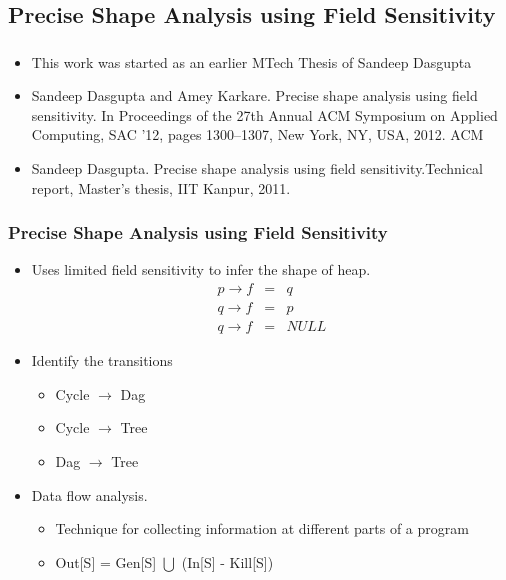 \documentclass[mathserif,10pt]{beamer}
\newcommand{\cmt}[1]{}
\newcommand{\p}{\ensuremath{p}}
\newcommand{\q}{\ensuremath{q}}
\newcommand{\f}{\ensuremath{f}}
\begin{document}
\subsection{Precise Shape Analysis using Field Sensitivity}

\frame
{
  \frametitle{\subsecname}

  \begin{itemize}
   \item This work was started as an earlier MTech Thesis of Sandeep Dasgupta 
   \item Sandeep Dasgupta and Amey Karkare. Precise shape analysis using field
    sensitivity. In Proceedings of the 27th Annual ACM Symposium on Applied
    Computing, SAC ’12, pages 1300–1307, New York, NY, USA, 2012. ACM
   \item Sandeep Dasgupta. Precise shape analysis using field sensitivity.Technical report, Master’s thesis, IIT Kanpur, 2011.
  \end{itemize}

}
\frame
{
  \frametitle{Precise Shape Analysis using Field Sensitivity}  
   \begin{itemize}
    \item Uses limited field sensitivity to infer the shape of heap. 
	    \begin{eqnarray*}
	  \p \rightarrow \f &=& \q \\ 
	  \q \rightarrow \f &=& \p \\ 
	  \q \rightarrow \f &=& NULL
	  \end{eqnarray*}
    \item Identify the transitions 
    \begin{itemize}
     \item Cycle $\rightarrow$ Dag
     \item Cycle $\rightarrow$ Tree
     \item Dag $\rightarrow$ Tree
    \end{itemize}
    \item Data flow analysis.
    \begin{itemize}
     \item Technique for collecting information at different parts of a program
      \cmt{With the help of CFG they know in which path these set of values are going}
     \item Out[S] = Gen[S] $\bigcup$ (In[S] - Kill[S])
    \end{itemize}

   \end{itemize}
}
\end{document}
